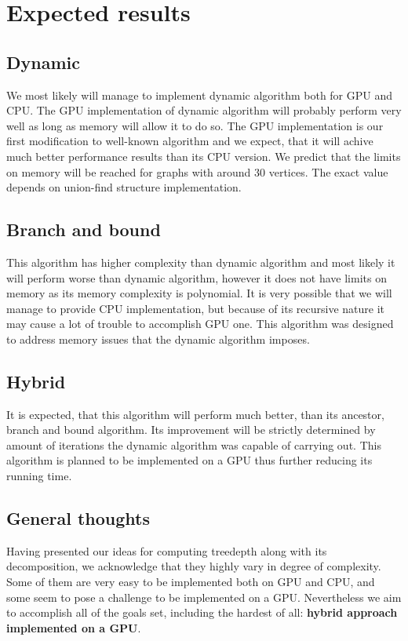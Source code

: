\section{Expected results}

\subsection{Dynamic}
We most likely will manage to implement dynamic algorithm both for GPU and CPU. The GPU implementation of dynamic algorithm will probably perform very well as long as memory will allow it to do so. The GPU implementation is our first modification to well-known algorithm and we expect, that it will achive much better performance results than its CPU version. We predict that the limits on memory will be reached for graphs with around 30 vertices. The exact value depends on union-find structure implementation.

\subsection{Branch and bound}
This algorithm has higher complexity than dynamic algorithm and most likely it will perform worse than dynamic algorithm, however it does not have limits on memory as its memory complexity is polynomial. It is very possible that we will manage to provide CPU implementation, but because of its recursive nature it may cause a lot of trouble to accomplish GPU one. This algorithm was designed to address memory issues that the dynamic algorithm imposes.

\subsection{Hybrid}
It is expected, that this algorithm will perform much better, than its ancestor, branch and bound algorithm. Its improvement will be strictly determined by amount of iterations the dynamic algorithm was capable of carrying out. This algorithm is planned to be implemented on a GPU thus further reducing its running time.

\subsection{General thoughts}
Having presented our ideas for computing treedepth along with its decomposition, we acknowledge that they highly vary in degree of complexity. Some of them are very easy to be implemented both on GPU and CPU, and some seem to pose a challenge to be implemented on a GPU. Nevertheless we aim to accomplish all of the goals set, including the hardest of all: \textbf{hybrid approach implemented on a GPU}.
